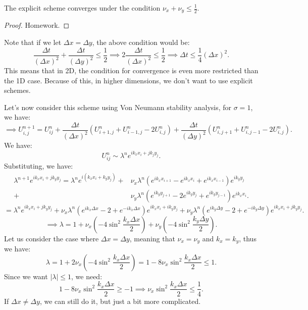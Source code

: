 \documentclass[../main/main.tex]{subfiles}
\begin{document}
\begin{theorem}
   The explicit scheme converges under the condition $\nu_x + \nu_y \le  \frac{1}{2}$. 
\end{theorem}
\begin{proof}
   Homework. 
\end{proof}

\begin{remark}
   Note that if we let $\Delta x= \Delta y$, the above condition would be:  \[
       \frac{\Delta t}{(\Delta x) ^2} + \frac{\Delta t}{(\Delta y) ^2} \le  \frac{1}{2} \implies 2 \frac{\Delta t}{(\Delta x)^2} \le  \frac{1}{2} \implies \Delta t \le  \frac{1}{4}(\Delta x)^2
   .\]   This means that in 2D, the condition for convergence is even more restricted than the 1D case. Because of this, in higher dimensions, we don't want to use explicit schemes.
\end{remark}

Let's now consider this scheme using Von Neumann stability analysis, for $\sigma = 1$, we have: \[ 
\implies U_{i,j}^{n+1} = U_{ij}^n + \frac{\Delta t}{(\Delta x)^2} \left( U_{i+1,j}^n + U_{i-1,j}^n - 2U_{i,j}^n \right) +\frac{\Delta t}{(\Delta y)^2} \left( U_{i,j+1}^n + U_{i,j-1}^n - 2U_{i,j}^n \right)  
.\] 
We have: \[
    U_{ij}^n \sim \lambda^n e^{ik_x x_i + jk_jy_j}
.\] Substituting, we have:
\begin{align*}
    \lambda^{n+1} e^{ik_x x_i + jk_y y_j} = \lambda^{n} e^{i(k_x x_i + k_y y_j)} + &\nu_x \lambda^n \left( e^{ik_x x_{i+1}} - e^{ik_x x_i} + e^{ik_x x_{i-1}} \right) e^{ik_y y_j} \\+ &\nu_y \lambda^n \left( e^{ik_y y_{j+1}} -2 e^{ik_y y_{j}} +e^{ik_y y_{j-1}} \right)  e^{ik_x x_i} 
.\end{align*}
 \[
= \lambda^{n}e^{i k_x x_i + jk_y y_j} + \nu_x \lambda^n \left( e^{ik_x\Delta x} - 2 + e^{-ik_x \Delta x} \right) e^{ik_x x_i + ik_y y_j}+ \nu_y \lambda^{n} \left( e^{ik_y \Delta y} - 2 + e^{-ik_y \Delta y} \right)  e^{ik_x x_i + jk_y y_j}
.\] \[
\implies \lambda = 1 + \nu_x\left( -4 \sin^2 \frac{k_x \Delta x}{2}\right) + \nu_y \left( -4\sin^2 \frac{k_y \Delta y}{2}\right) 
.\] Let us consider the case where $\Delta x = \Delta y$, meaning that  $\nu_x = \nu_y$ and  $k_x = k_y$, thus we have:  \[
\lambda = 1+2\nu_x \left( -4 \sin^2 \frac{k_x \Delta x}{2} \right)  = 1-8 \nu_x \sin^2 \frac{k_x \Delta x}{2} \le  1
.\] Since we want $|\lambda|\le 1$, we need: \[
1 - 8 \nu_x \sin^2 \frac{k_x \Delta x}{2}\ge -1 \implies \nu_x \sin^2 \frac{k_x \Delta x}{2} \le  \frac{1}{4}
.\] If $\Delta x \neq \Delta y$, we can still do it, but just a bit more complicated.
\end{document}
